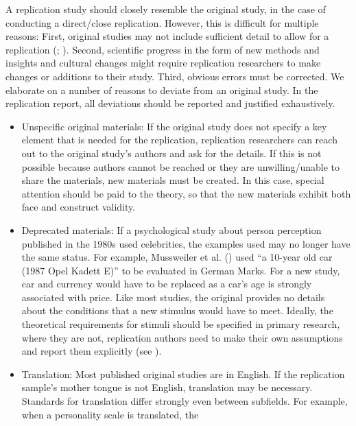 \documentclass[
  letterpaper,
  DIV=11,
  openany,
  fontsize=12pt,
  parskip=half,
  headings=big,
  numbers=noenddot,
  titlepage=false]{scrreprt}
\begin{document}
A replication study should closely resemble the original study, in the
case of conducting a direct/close replication. However, this is
difficult for multiple reasons: First, original studies may not include
sufficient detail to allow for a replication
(;
).
Second, scientific progress in the form of new methods and insights and
cultural changes might require replication researchers to make changes
or additions to their study. Third, obvious errors must be corrected. We
elaborate on a number of reasons to deviate from an original study. In
the replication report, all deviations should be reported and justified
exhaustively.

\begin{itemize}
\item
  {Unspecific original materials:} If the original study does not
  specify a key element that is needed for the replication, replication
  researchers can reach out to the original study's authors and ask for
  the details. If this is not possible because authors cannot be reached
  or they are unwilling/unable to share the materials, new materials
  must be created. In this case, special attention should be paid to the
  theory, so that the new materials exhibit both face and construct
  validity.
\item
  {Deprecated materials:} If a psychological study about person
  perception published in the 1980s used celebrities, the examples used
  may no longer have the same status. For example, Mussweiler et al.
  () used ``a 10-year old car
  (1987 Opel Kadett E)'' to be evaluated in German Marks. For a new
  study, car and currency would have to be replaced as a car's age is
  strongly associated with price. Like most studies, the original
  provides no details about the conditions that a new stimulus would
  have to meet. Ideally, the theoretical requirements for stimuli should
  be specified in primary research, where they are not, replication
  authors need to make their own assumptions and report them explicitly
  (see ).
\item
  {Translation:} Most published original studies are in English. If the
  replication sample's mother tongue is not English, translation may be
  necessary. Standards for translation differ strongly even between
  subfields. For example, when a personality scale is translated, the

\end{itemize}
\end{document}
